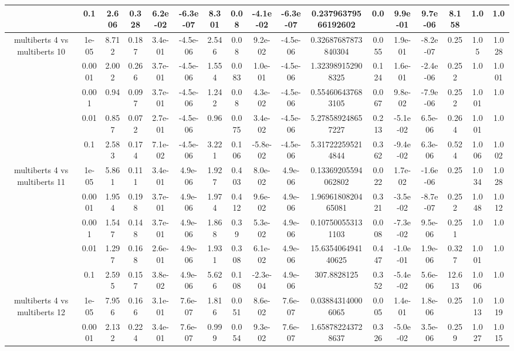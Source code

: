 \begin{tabular}{|c|c|c|c|c|c|c|c|c|c|c|c|c|c|c|c|c|}
 & 0.1 & 2.606 & 0.328 & 6.2e-02 & -6.3e-07 & 8.301 & 0.08 & -4.1e-02 & -6.3e-07 & 0.23796379566192602 & 0.0 & 9.9e-01 & 9.7e-06 & 8.158 & 1.0 & 1.0 \\
\hline
\multirow{5}{*}{multiberts 4 vs multiberts 10} & 1e-05 & 8.712 & 0.187 & 3.4e-01 & -4.5e-06 & 2.546 & 0.08 & 9.2e-02 & -4.5e-06 & 0.32687687873840304 & 0.055 & 1.9e-01 & -8.2e-07 & 0.25 & 1.05 & 1.028 \\
 & 0.0001 & 2.002 & 0.266 & 3.7e-01 & -4.5e-06 & 1.554 & 0.083 & 1.0e-01 & -4.5e-06 & 1.323989152908325 & 0.124 & 1.6e-01 & -2.4e-06 & 0.252 & 1.0 & 1.001 \\
 & 0.001 & 0.94 & 0.097 & 3.7e-01 & -4.5e-06 & 1.242 & 0.08 & 4.3e-02 & -4.5e-06 & 0.554606437683105 & 0.067 & 9.8e-02 & -7.9e-06 & 0.252 & 1.001 & 1.0 \\
 & 0.01 & 0.857 & 0.072 & 2.7e-01 & -4.5e-06 & 0.96 & 0.075 & 3.4e-02 & -4.5e-06 & 5.278589248657227 & 0.213 & -5.1e-02 & 6.5e-06 & 0.264 & 1.001 & 1.0 \\
 & 0.1 & 2.583 & 0.174 & 7.1e-02 & -4.5e-06 & 3.221 & 0.106 & -5.8e-02 & -4.5e-06 & 5.317222595214844 & 0.362 & -9.4e-02 & 6.3e-06 & 0.524 & 1.006 & 1.002 \\
\hline
\multirow{5}{*}{multiberts 4 vs multiberts 11} & 1e-05 & 5.861 & 0.111 & 3.4e-01 & 4.9e-06 & 1.927 & 0.403 & 8.0e-02 & 4.9e-06 & 0.13369205594062802 & 0.022 & 1.7e-02 & -1.6e-06 & 0.25 & 1.034 & 1.028 \\
 & 0.0001 & 1.954 & 0.198 & 3.7e-01 & 4.9e-06 & 1.974 & 0.412 & 9.6e-02 & 4.9e-06 & 1.9696180820465081 & 0.321 & -3.5e-02 & -8.7e-07 & 0.252 & 1.048 & 1.012 \\
 & 0.001 & 1.547 & 0.148 & 3.7e-01 & 4.9e-06 & 1.868 & 0.39 & 5.3e-02 & 4.9e-06 & 0.107500553131103 & 0.008 & -7.3e-02 & 9.5e-06 & 0.251 & 1.0 & 1.0 \\
 & 0.01 & 1.297 & 0.168 & 2.6e-01 & 4.9e-06 & 1.931 & 0.308 & 6.1e-02 & 4.9e-06 & 15.635406494140625 & 0.447 & -1.0e-01 & 1.9e-06 & 0.327 & 1.001 & 1.0 \\
 & 0.1 & 2.595 & 0.157 & 3.8e-02 & 4.9e-06 & 5.626 & 0.108 & -2.3e-04 & 4.9e-06 & 307.8828125 & 0.352 & -5.4e-02 & 5.6e-06 & 12.613 & 1.006 & 1.0 \\
\hline
\multirow{5}{*}{multiberts 4 vs multiberts 12} & 1e-05 & 7.956 & 0.166 & 3.1e-01 & 7.6e-07 & 1.816 & 0.051 & 8.6e-02 & 7.6e-07 & 0.038843140006065 & 0.005 & 1.4e-01 & 1.8e-06 & 0.25 & 1.013 & 1.019 \\
 & 0.0001 & 2.132 & 0.224 & 3.4e-01 & 7.6e-07 & 0.999 & 0.054 & 9.3e-02 & 7.6e-07 & 1.658782243728637 & 0.326 & -5.0e-02 & 3.5e-06 & 0.259 & 1.027 & 1.015 \\

\end{tabular}
